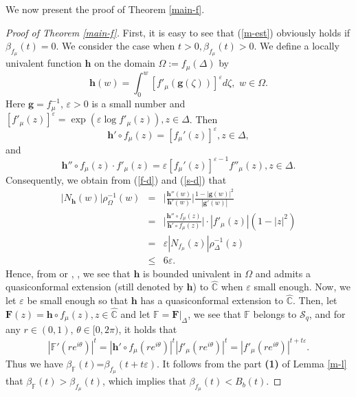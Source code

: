 \documentclass[11pt]{amsart}
\theoremstyle{remark}
\theoremstyle{claim}
\theoremstyle{definition}
\theoremstyle{problem}
\theoremstyle{conjecture}
\theoremstyle{question}
\numberwithin{equation}{section}
\begin{document}
We now present the proof of Theorem \ref{main-f}. 

\begin{proof}[Proof of Theorem \ref{main-f}]
First, it is easy to see that (\ref{m-est}) obviously holds if $\beta_{f_{\mu}}(t)=0$.  We consider the case when $t>0, \beta_{f_{\mu}}(t)>0$. 
We define a locally univalent function $\mathbf{h}$ on the domain $\Omega:=f_{\mu}(\Delta)$ by 
\begin{equation}
\mathbf{h}(w)=\int_{0}^{w} [f'_{\mu}(\mathbf{g}(\zeta))]^{\varepsilon}d\zeta,\,\, w\in \Omega. \nonumber
\end{equation}
Here $\mathbf{g}=f_{\mu}^{-1}$, $\varepsilon>0$ is a small number and $[f'_{\mu}(z)]^{\varepsilon}=\exp(\varepsilon \log f'_{\mu}(z)), z \in \Delta$. Then 
\begin{equation}\label{f-d}
\mathbf{h}'\circ f_{\mu}(z)=[f_{\mu}'(z)]^{\varepsilon}, z\in \Delta,
\end{equation}
and 
\begin{equation}\label{s-d}
\mathbf{h}''\circ f_{\mu}(z) \cdot f'_{\mu}(z)=\varepsilon[f_{\mu}'(z)]^{\varepsilon-1}f''_{\mu}(z), z\in \Delta. 
\end{equation}
Consequently, we obtain from (\ref{f-d}) and (\ref{s-d}) that
\begin{eqnarray}
|N_{\mathbf{h}}(w)|\rho_{\Omega}^{-1}(w)&=&\Big|\frac{\mathbf{h}''(w)}{\mathbf{h}'(w)} \Big|\frac{1-|\mathbf{g}(w)|^2}{|\mathbf{g}'(w)|}\nonumber \\
&=&\Big|\frac{\mathbf{h}''\circ f_{\mu}(z)}{\mathbf{h}'\circ f_{\mu}(z)}\Big| \cdot |f'_{\mu}(z)|(1-|z|^2)\nonumber \\
&=& \varepsilon |N_{f_{\mu}}(z)|\rho_{\Delta}^{-1}(z) \nonumber \\
&\leq& 6\varepsilon.  \nonumber
\end{eqnarray} %
Hence, from \cite{Bec} or \cite{AG1}, \cite{Zhur}, we see that  $\mathbf{h}$ is bounded univalent in $\Omega$ and admits a quasiconformal extension (still denoted by $\mathbf{h}$)  to $\widehat{\mathbb{C}}$ when $\varepsilon$ small enough.  Now, we let  $\varepsilon$ be small enough so that $\mathbf{h}$ has a quasiconformal extension to $\widehat{\mathbb{C}}$. Then, let $\mathbf{F}(z)=\mathbf{h}\circ f_{\mu}(z), z\in \widehat{\mathbb{C}}$ and let $\mathbb{F}=\mathbf{F}|_{\Delta}$, we see that $\mathbb{F}$ belongs to $\mathcal{S}_q$, and for any $r\in (0, 1)$, $\theta \in [0,2\pi)$, it holds that
\begin{eqnarray}
|\mathbb{F}'(re^{i\theta})|^{t}=
|\mathbf{h}'\circ f_{\mu}(re^{i\theta})|^{t}|f'_{\mu}(re^{i\theta})|^{t}=|f'_{\mu}(re^{i\theta})|^{t+t\varepsilon}. \nonumber 
\end{eqnarray}
Thus we have $\beta_{\mathbb{F}}(t)$=$\beta_{f_{\mu}}(t+t\varepsilon)$. It follows from the part {\bf (1)} of Lemma \ref{m-l} that $\beta_{\mathbb{F}}(t)>\beta_{f_{\mu}}(t)$, which implies that $\beta_{f_{\mu}}(t)<B_b(t)$.  


\end{proof}
\end{document}
